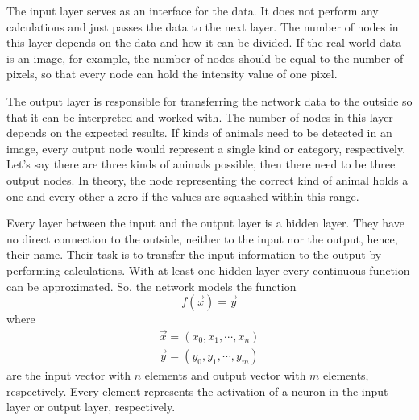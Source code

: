 The input layer serves as an interface for the data.
It does not perform any calculations and just passes the data to the next layer.
The number of nodes in this layer depends on the data and how it can be divided.
If the real-world data is an image, for example, the number of nodes should be equal to the number of pixels, so that every node can hold the intensity value of one pixel.

The output layer is responsible for transferring the network data to the outside so that it can be interpreted and worked with.
The number of nodes in this layer depends on the expected results.
If kinds of animals need to be detected in an image, every output node would represent a single kind or category, respectively.
Let's say there are three kinds of animals possible, then there need to be three output nodes.
In theory, the node representing the correct kind of animal holds a one and every other a zero if the values are squashed within this range.

Every layer between the input and the output layer is a hidden layer.
They have no direct connection to the outside, neither to the input nor the output, hence, their name.
Their task is to transfer the input information to the output by performing calculations.
With at least one hidden layer every continuous function can be approximated.
So, the network models the function 
\begin{equation}
	\label{eq:multilayer-perceptron}
	f(\vec{x}) = \vec{y}
\end{equation}
where
\begin{align}
	\vec{x} = (x_0, x_1, \cdots, x_n) \\
	\vec{y} = (y_0, y_1, \cdots, y_m)
\end{align}
are the input vector with $n$ elements and output vector with $m$ elements, respectively.
Every element represents the activation of a neuron in the input layer or output layer, respectively.

